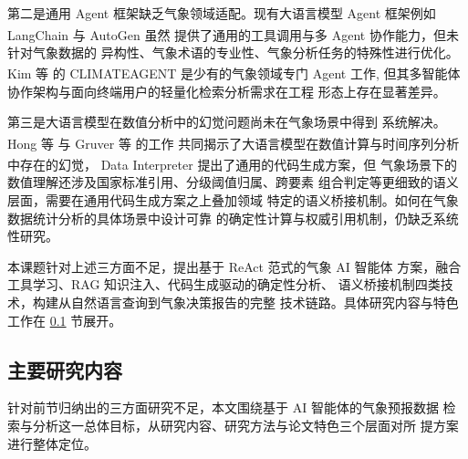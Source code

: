 \documentclass[a4paper]{article}
\theoremstyle{definition}
\theoremstyle{plain}
\theoremstyle{remark}
\newcommand{\reffig}[1]{图 \ref{#1}}
\newcommand{\reftab}[1]{表 \ref{#1}}
\let\oldcite\cite
\renewcommand{\cite}[1]{\textsuperscript{\oldcite{#1}}}
\begin{document}
第二是通用 Agent 框架缺乏气象领域适配。现有大语言模型 Agent
框架例如 LangChain \cite{ref15} 与 AutoGen \cite{ref19} 虽然
提供了通用的工具调用与多 Agent 协作能力，但未针对气象数据的
异构性、气象术语的专业性、气象分析任务的特殊性进行优化。Kim 等
\cite{ref1} 的 CLIMATEAGENT 是少有的气象领域专门 Agent 工作,
但其多智能体协作架构与面向终端用户的轻量化检索分析需求在工程
形态上存在显著差异。

第三是大语言模型在数值分析中的幻觉问题尚未在气象场景中得到
系统解决。Hong 等 \cite{ref20} 与 Gruver 等 \cite{ref22} 的工作
共同揭示了大语言模型在数值计算与时间序列分析中存在的幻觉，
Data Interpreter \cite{ref20} 提出了通用的代码生成方案，但
气象场景下的数值理解还涉及国家标准引用、分级阈值归属、跨要素
组合判定等更细致的语义层面，需要在通用代码生成方案之上叠加领域
特定的语义桥接机制。如何在气象数据统计分析的具体场景中设计可靠
的确定性计算与权威引用机制，仍缺乏系统性研究。

本课题针对上述三方面不足，提出基于 ReAct 范式的气象 AI 智能体
方案，融合工具学习、RAG 知识注入、代码生成驱动的确定性分析、
语义桥接机制四类技术，构建从自然语言查询到气象决策报告的完整
技术链路。具体研究内容与特色工作在 \ref{sec:research-content}
节展开。




\subsection{主要研究内容}
\label{sec:research-content}

针对前节归纳出的三方面研究不足，本文围绕基于 AI 智能体的气象预报数据
检索与分析这一总体目标，从研究内容、研究方法与论文特色三个层面对所
提方案进行整体定位。
\end{document}
